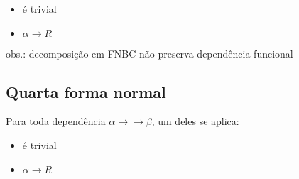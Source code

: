 \begin{tcolorbox}[sharp corners, colback=white,boxrule=1mm]
	\begin{itemize}
		\item é trivial
		\item $\alpha \to R$
	\end{itemize}
	obs.: decomposição em FNBC não preserva dependência funcional
	
	\subsection{Quarta forma normal}
	Para toda dependência $\alpha\to\to\beta$, um deles se aplica:
	\begin{itemize}
		\item é trivial
		\item $\alpha \to R$
	\end{itemize} 
\end{tcolorbox}